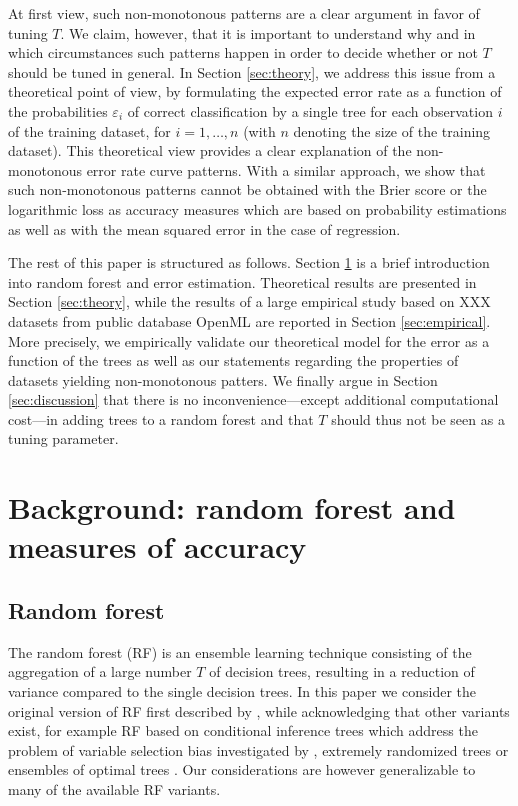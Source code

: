 \documentclass[paper=a4
               ,12pt
               ,DIV=12
               ,parskip=half
               ,titlepage=on
               ,headinclude 
               ,footinclude
               ,headsepline
               ,footsepline         %
               ,ilines 
               ]{scrartcl}
\begin{document}
At first view, such non-monotonous patterns are a clear argument in favor of tuning  $T$. We claim, however, that it is important to understand why and in which circumstances such patterns happen in order to decide 
whether or not $T$ should be tuned in general. In Section \ref{sec:theory}, we address this issue from a theoretical point of view, by formulating the expected error rate as a function of the probabilities $\varepsilon_i$ 
of correct classification by a single tree for each observation $i$ of the training dataset, for $i=1,\dots,n$ (with $n$ denoting the size of the training dataset). This theoretical view provides a clear explanation of the 
non-monotonous error rate curve patterns. With a similar approach, we show that such non-monotonous patterns cannot be obtained with the Brier score or the logarithmic loss as accuracy measures which are based on probability estimations as well as with the mean squared 
error in the case of regression.

The rest of this paper is structured as follows. Section \ref{sec:background} is a brief introduction into random forest and error estimation. Theoretical results are presented in Section \ref{sec:theory}, while the 
results of a large empirical study based on XXX datasets from public database OpenML \citep{OpenML2013} are reported in Section \ref{sec:empirical}. More precisely, we empirically validate our theoretical model for the 
error as a function of the trees as well as our statements regarding the properties of datasets yielding non-monotonous patters. We finally argue in Section \ref{sec:discussion} that there is no inconvenience---except 
additional computational cost---in adding trees to a random forest and that  $T$  should thus not be seen as a tuning parameter. 



\section{Background: random forest and measures of accuracy}
\label{sec:background}
\subsection{Random forest}
The random forest (RF) is an ensemble learning technique consisting of the aggregation of a large number $T$ of decision trees, resulting in a reduction of variance compared to the single decision trees. 
In this paper we consider the original version of RF first described by \citep{Breiman2001}, while acknowledging that other variants exist, for example RF based on conditional inference trees \citep{Hothorn2006} 
which address the problem of variable selection bias investigated by \citet{Strobl2007}, extremely randomized trees \citep{Geurts2006} or ensembles of optimal trees \citet{Khan2016}. Our considerations are 
however generalizable to many of the available RF variants.
\end{document}
